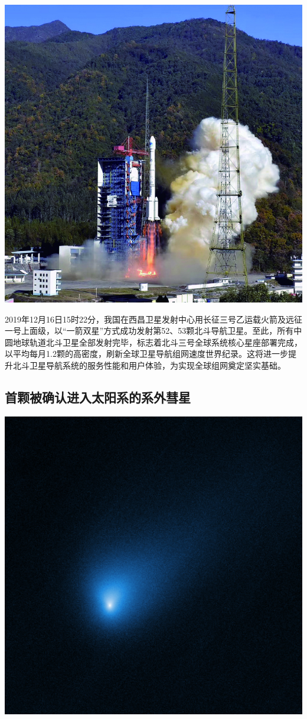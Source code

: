 \begin{multicols}{3}
\noindent\includegraphics[width=\linewidth]{IMG/201912/1112.jpg}

2019年12月16日15时22分，我国在西昌卫星发射中心用长征三号乙运载火箭及远征一号上面级，以“一箭双星”方式成功发射第52、53颗北斗导航卫星。至此，所有中圆地球轨道北斗卫星全部发射完毕，标志着北斗三号全球系统核心星座部署完成，以平均每月1.2颗的高密度，刷新全球卫星导航组网速度世界纪录。这将进一步提升北斗卫星导航系统的服务性能和用户体验，为实现全球组网奠定坚实基础。

\subsection*{首颗被确认进入太阳系的系外彗星}

\noindent\includegraphics[width=\linewidth]{IMG/201912/stsci-h-p1953a-f-1106x1106.png}


\end{multicols}
